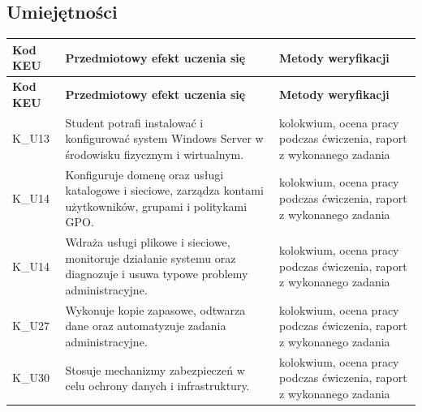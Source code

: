 \documentclass[12pt, a4paper]{article}
\newcommand{\thdrule}{\noalign{\global\setlength{\extrarowheight}{0pt}}}
\newcommand{\thdend}{\noalign{\global\setlength{\extrarowheight}{3pt}}}
\begin{document}
\subsection*{Umiejętności}
{\scriptsize
\begin{longtable}{m{1.6cm}m{9.0cm}m{4.2cm}}
\thdrule\toprule
\rowcolor{pjatkRed} {\color{white}\footnotesize\textbf{\vphantom{Ag}Kod KEU}} & {\color{white}\footnotesize\textbf{\vphantom{Ag}Przedmiotowy efekt uczenia się}} & {\color{white}\footnotesize\textbf{\vphantom{Ag}Metody weryfikacji}} \\
\midrule\thdend
\endfirsthead
\thdrule\toprule
\rowcolor{pjatkRed} {\color{white}\footnotesize\textbf{\vphantom{Ag}Kod KEU}} & {\color{white}\footnotesize\textbf{\vphantom{Ag}Przedmiotowy efekt uczenia się}} & {\color{white}\footnotesize\textbf{\vphantom{Ag}Metody weryfikacji}} \\
\midrule\thdend
\endhead
  \rowcolor{tableRowLight} K\_U13 & Student potrafi instalować i konfigurować system Windows Server w środowisku fizycznym i wirtualnym. & kolokwium, ocena pracy podczas ćwiczenia, raport z wykonanego zadania \\
  \rowcolor{tableRowAlt} K\_U14 & Konfiguruje domenę oraz usługi katalogowe i sieciowe, zarządza kontami użytkowników, grupami i politykami GPO. & kolokwium, ocena pracy podczas ćwiczenia, raport z wykonanego zadania \\
  \rowcolor{tableRowLight} K\_U14 & Wdraża usługi plikowe i sieciowe, monitoruje działanie systemu oraz diagnozuje i usuwa typowe problemy administracyjne. & kolokwium, ocena pracy podczas ćwiczenia, raport z wykonanego zadania \\
  \rowcolor{tableRowAlt} K\_U27 & Wykonuje kopie zapasowe, odtwarza dane oraz automatyzuje zadania administracyjne. & kolokwium, ocena pracy podczas ćwiczenia, raport z wykonanego zadania \\
  \rowcolor{tableRowLight} K\_U30 & Stosuje mechanizmy zabezpieczeń w celu ochrony danych i infrastruktury. & kolokwium, ocena pracy podczas ćwiczenia, raport z wykonanego zadania \\
\bottomrule
\end{longtable}}
\end{document}
